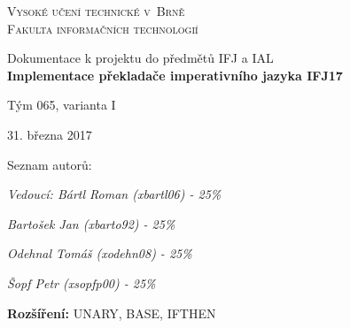 \documentclass[11pt,a4paper]{article}
\begin{document}
    \begin{titlepage}
    \begin{center}
      {\Huge
      \textsc{Vysoké učení technické v~Brně} \\
      \medskip
		\huge{\textsc{Fakulta informačních technologií}}
       }\\
      \begin{figure}[h]
		\begin{center}
		\end{center}
	  \end{figure}
      {\LARGE
      Dokumentace k projektu do předmětů IFJ a IAL}\\
      \LARGE{\textbf{Implementace překladače imperativního jazyka IFJ17}}
      
      {\LARGE Tým 065, varianta I}
      
      {\LARGE 31. března 2017}
      
      {\LARGE Seznam autorů:\\}
      {\Large\itshape Vedoucí: Bártl Roman (xbartl06) - 25\%\par}
        {\Large\itshape Bartošek Jan (xbarto92) - 25\%\par}
        {\Large\itshape Odehnal Tomáš (xodehn08) - 25\%\par}
        {\Large\itshape Šopf Petr (xsopfp00) - 25\%\par}
        {\Large \textbf{Rozšíření:} UNARY, BASE, IFTHEN}
    \end{center}
\end{titlepage}
    
    \doublespacing
	\tableofcontents
	\singlespacing
    \newpage
\end{document}
